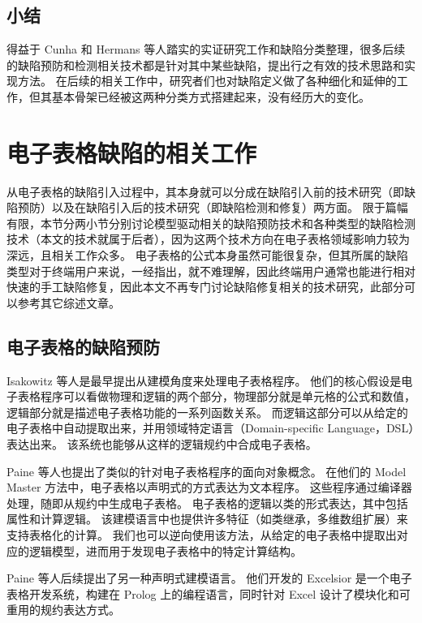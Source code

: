 \subsection{小结}
得益于 Cunha 和 Hermans 等人踏实的实证研究工作和缺陷分类整理\cite{cunha2012towards,hermans2012detecting2,jansen2015code}，很多后续的缺陷预防和检测相关技术都是针对其中某些缺陷，提出行之有效的技术思路和实现方法。
在后续的相关工作中，研究者们也对缺陷定义做了各种细化和延伸的工作，但其基本骨架已经被这两种分类方式搭建起来，没有经历大的变化。


\section{电子表格缺陷的相关工作}
从电子表格的缺陷引入过程中，其本身就可以分成在缺陷引入前的技术研究（即缺陷预防）以及在缺陷引入后的技术研究（即缺陷检测和修复）两方面。
限于篇幅有限，本节分两小节分别讨论模型驱动相关的缺陷预防技术和各种类型的缺陷检测技术（本文的技术就属于后者），因为这两个技术方向在电子表格领域影响力较为深远，且相关工作众多。
电子表格的公式本身虽然可能很复杂，但其所属的缺陷类型对于终端用户来说，一经指出，就不难理解，因此终端用户通常也能进行相对快速的手工缺陷修复，因此本文不再专门讨论缺陷修复相关的技术研究，此部分可以参考其它综述文章\cite{jannach2014avoiding}。

\subsection{电子表格的缺陷预防}
Isakowitz 等人\cite{isakowitz1995toward}是最早提出从建模角度来处理电子表格程序。
他们的核心假设是电子表格程序可以看做物理和逻辑的两个部分，物理部分就是单元格的公式和数值，逻辑部分就是描述电子表格功能的一系列函数关系。
而逻辑这部分可以从给定的电子表格中自动提取出来，并用领域特定语言（Domain-specific Language，DSL）表达出来。
该系统也能够从这样的逻辑规约中合成电子表格。

Paine 等人\cite{ireson1997model,paine2008ensuring}也提出了类似的针对电子表格程序的面向对象概念。
在他们的 Model Master 方法中，电子表格以声明式的方式表达为文本程序。
这些程序通过编译器处理，随即从规约中生成电子表格。
电子表格的逻辑以类的形式表达，其中包括属性和计算逻辑。
该建模语言中也提供许多特征（如类继承，多维数组扩展）来支持表格化的计算。
我们也可以逆向使用该方法，从给定的电子表格中提取出对应的逻辑模型，进而用于发现电子表格中的特定计算结构\cite{paine2008spreadsheet}。

Paine 等人\cite{paine2005bringing,paine2008rapid}后续提出了另一种声明式建模语言。
他们开发的 Excelsior 是一个电子表格开发系统，构建在 Prolog 上的编程语言，同时针对 Excel 设计了模块化和可重用的规约表达方式。

